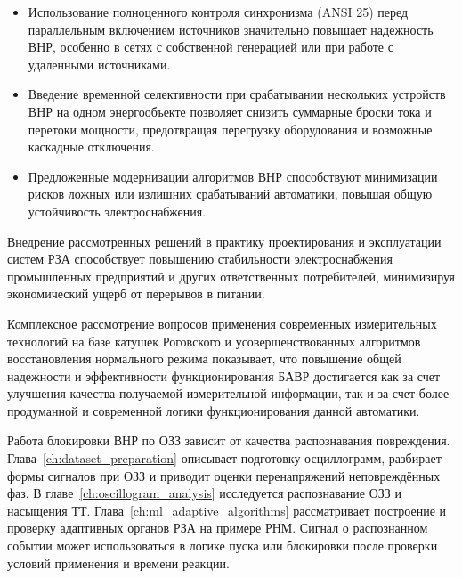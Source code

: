\begin{enumerate}[label=\arabic*)]
\begin{itemize}
        \item Использование полноценного контроля синхронизма (ANSI 25) перед параллельным включением источников значительно повышает надежность ВНР, особенно в сетях с собственной генерацией или при работе с удаленными источниками.
        \item Введение временной селективности при срабатывании нескольких устройств ВНР на одном энергообъекте позволяет снизить суммарные броски тока и перетоки мощности, предотвращая перегрузку оборудования и возможные каскадные отключения.
        \item Предложенные модернизации алгоритмов ВНР способствуют минимизации рисков ложных или излишних срабатываний автоматики, повышая общую устойчивость электроснабжения.
    \end{itemize}
\end{enumerate}

Внедрение рассмотренных решений в практику проектирования и эксплуатации систем РЗА
способствует повышению стабильности электроснабжения промышленных предприятий и других
ответственных потребителей, минимизируя экономический ущерб от перерывов в
питании.\par\vspace{0.2cm}

Комплексное рассмотрение вопросов применения современных измерительных технологий на
базе катушек Роговского и усовершенствованных алгоритмов восстановления нормального
режима показывает, что повышение общей надежности и эффективности функционирования БАВР
достигается как за счет улучшения качества получаемой измерительной информации, так и за
счет более продуманной и современной логики функционирования данной
автоматики.\par\vspace{0.2cm}

Работа блокировки ВНР по ОЗЗ зависит от качества распознавания повреждения. Глава~\ref{ch:dataset_preparation} описывает подготовку осциллограмм, разбирает формы сигналов при ОЗЗ и приводит оценки перенапряжений неповреждённых фаз. В главе~\ref{ch:oscillogram_analysis} исследуется распознавание ОЗЗ и насыщения ТТ. Глава~\ref{ch:ml_adaptive_algorithms} рассматривает построение и проверку адаптивных органов РЗА на примере РНМ. Сигнал о распознанном событии может использоваться в логике пуска или блокировки после проверки условий применения и времени реакции.

